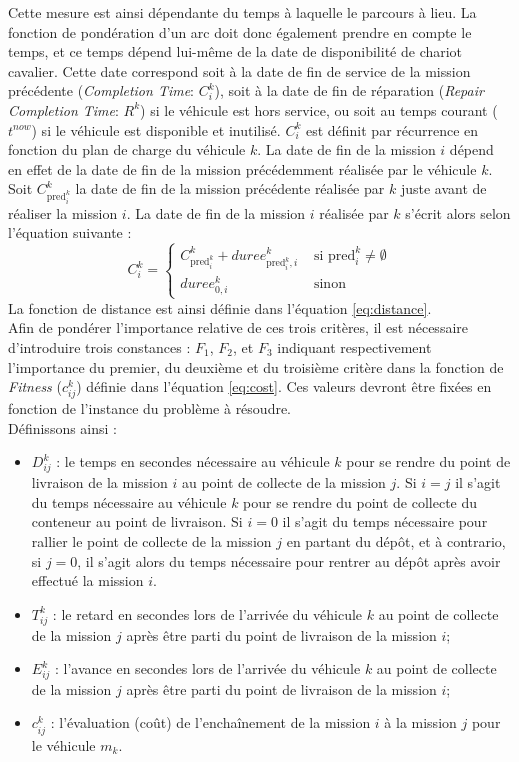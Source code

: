 Cette mesure est ainsi dépendante du temps à laquelle le parcours à lieu.
La fonction de pondération d'un arc doit donc également prendre en compte le temps, et ce temps dépend lui-même de la date de disponibilité de chariot cavalier. 
Cette date correspond soit à la date de fin de service de la mission précédente (\textit{Completion Time}: $C_i^k$), soit à la date de fin de réparation (\textit{Repair Completion Time}: $R^k$) si le véhicule est hors service, ou soit au temps courant ($t^{now}$) si le véhicule est disponible et inutilisé.
$C_i^k$ est définit par récurrence en fonction du plan de charge du véhicule $k$. La date de fin de la mission $i$ dépend en effet de la date de fin de la mission précédemment réalisée par le véhicule $k$. Soit $C^k_{\text{pred}^k_i}$ la date de fin de la mission précédente réalisée par $k$ juste avant de réaliser la mission $i$. La date de fin de la mission $i$ réalisée par $k$ s'écrit alors selon l'équation suivante : 
\begin{equation}
 \label{eq:completionTime}
 C_i^k = 
 \begin{cases}
  C^k_{\text{pred}^k_i} + duree^k_{\text{pred}^k_i,i} & \text{ si pred}^k_i \neq \emptyset \\
  duree^k_{0,i} & \text{ sinon}
 \end{cases}
\end{equation}
La fonction de distance est ainsi définie dans l'équation \ref{eq:distance}.\\

Afin de pondérer l'importance relative de ces trois critères, il est nécessaire d'introduire trois constances : $F_1$, $F_2$, et $F_3$ indiquant respectivement l'importance du premier, du deuxième et du troisième critère dans la fonction de \textit{Fitness} ($c^k_{ij}$) définie dans l'équation \ref{eq:cost}. Ces valeurs devront être fixées en fonction de l'instance du problème à résoudre.\\

Définissons ainsi : 
\begin{itemize}
 \item $D^{k}_{ij}$ : le temps en secondes nécessaire au véhicule $k$ pour se rendre du point de livraison de la mission $i$ au point de collecte de la mission $j$. Si $i=j$ il s'agit du temps nécessaire au véhicule $k$ pour se rendre du point de collecte du conteneur au point de livraison. Si $i=0$ il s'agit du temps nécessaire pour rallier le point de collecte de la mission $j$ en partant du dépôt, et à contrario, si $j=0$, il s'agit alors du temps nécessaire pour rentrer au dépôt après avoir effectué la mission $i$.
 \item $T^{k}_{ij}$ : le retard en secondes lors de l'arrivée du véhicule $k$ au point de collecte de la mission $j$ après être parti du point de livraison de la mission $i$;
 \item $E^{k}_{ij}$ : l'avance en secondes lors de l'arrivée du véhicule $k$ au point de collecte de la mission $j$ après être parti du point de livraison de la mission $i$;
 \item $c^{k}_{ij}$ : l'évaluation (coût) de l'enchaînement de la mission $i$ à la mission $j$ pour le véhicule $m_k$.
\end{itemize}

